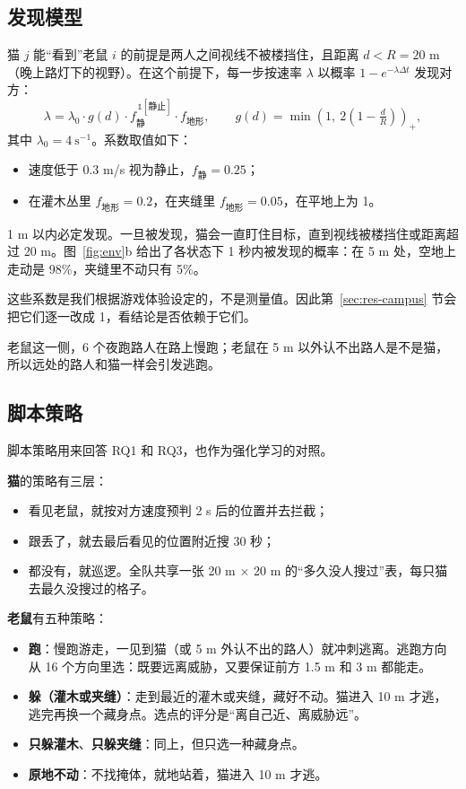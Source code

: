 \documentclass[a4paper,zihao=5,fontset=fandol,UTF8]{ctexart}
\begin{document}
\subsection{发现模型}
\label{sec:detect}
猫 $j$ 能“看到”老鼠 $i$ 的前提是两人之间视线不被楼挡住，且距离 $d<R=20$ m（晚上路灯下的视野）。在这个前提下，每一步按速率 $\lambda$ 以概率 $1-e^{-\lambda\Delta t}$ 发现对方：
\begin{equation}
\lambda = \lambda_0 \cdot g(d) \cdot f_{\text{静}}^{\,\mathbb{1}[\text{静止}]} \cdot f_{\text{地形}}, \qquad
g(d)=\min\!\left(1,\ 2\left(1-\tfrac{d}{R}\right)\right)_{+},
\end{equation}
其中 $\lambda_0=4\ \text{s}^{-1}$。系数取值如下：
\begin{itemize}
  \item 速度低于 0.3 m/s 视为静止，$f_{\text{静}}=0.25$；
  \item 在灌木丛里 $f_{\text{地形}}=0.2$，在夹缝里 $f_{\text{地形}}=0.05$，在平地上为 1。
\end{itemize}
1 m 以内必定发现。一旦被发现，猫会一直盯住目标，直到视线被楼挡住或距离超过 20 m。图~\ref{fig:env}b 给出了各状态下 1 秒内被发现的概率：在 5 m 处，空地上走动是 98\%，夹缝里不动只有 5\%。

这些系数是我们根据游戏体验设定的，不是测量值。因此第~\ref{sec:res-campus} 节会把它们逐一改成 1，看结论是否依赖于它们。

老鼠这一侧，6 个夜跑路人在路上慢跑；老鼠在 5 m 以外认不出路人是不是猫，所以远处的路人和猫一样会引发逃跑。

\subsection{脚本策略}
\label{sec:script}
脚本策略用来回答 RQ1 和 RQ3，也作为强化学习的对照。

\textbf{猫}的策略有三层：
\begin{itemize}
  \item 看见老鼠，就按对方速度预判 2 s 后的位置并去拦截；
  \item 跟丢了，就去最后看见的位置附近搜 30 秒；
  \item 都没有，就巡逻。全队共享一张 20 m × 20 m 的“多久没人搜过”表，每只猫去最久没搜过的格子。
\end{itemize}

\textbf{老鼠}有五种策略：
\begin{itemize}
  \item \textbf{跑}：慢跑游走，一见到猫（或 5 m 外认不出的路人）就冲刺逃离。逃跑方向从 16 个方向里选：既要远离威胁，又要保证前方 1.5 m 和 3 m 都能走。
  \item \textbf{躲（灌木或夹缝）}：走到最近的灌木或夹缝，藏好不动。猫进入 10 m 才逃，逃完再换一个藏身点。选点的评分是“离自己近、离威胁远”。
  \item \textbf{只躲灌木}、\textbf{只躲夹缝}：同上，但只选一种藏身点。
  \item \textbf{原地不动}：不找掩体，就地站着，猫进入 10 m 才逃。
\end{itemize}
\end{document}
